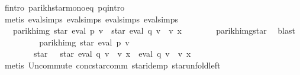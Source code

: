 \begin{isabellebody}
\ f{\isacharprime}{\kern0pt}{\isacharunderscore}{\kern0pt}intro\ parikh{\isacharunderscore}{\kern0pt}star{\isacharunderscore}{\kern0pt}mono{\isacharunderscore}{\kern0pt}eq\ p{\isacharunderscore}{\kern0pt}q{\isacharunderscore}{\kern0pt}intro\isanewline
\ \ \ \ \ \ \isamarkupfalse%
\ {\isacharparenleft}{\kern0pt}metis\ eval{\isachardot}{\kern0pt}simps{\isacharparenleft}{\kern0pt}{}{\isacharparenright}{\kern0pt}\ eval{\isachardot}{\kern0pt}simps{\isacharparenleft}{\kern0pt}{}{\isacharparenright}{\kern0pt}\ eval{\isachardot}{\kern0pt}simps{\isacharparenleft}{\kern0pt}{}{\isacharparenright}{\kern0pt}\ eval{\isachardot}{\kern0pt}simps{\isacharparenleft}{\kern0pt}{}{\isacharparenright}{\kern0pt}{\isacharparenright}{\kern0pt}\isanewline
\ \ \ \ \isamarkupfalse%
\ \isamarkupfalse%
\ {\isachardoublequoteopen}{\isasymdots}\ {\isacharequal}{\kern0pt}\ parikh{\isacharunderscore}{\kern0pt}img\ {\isacharparenleft}{\kern0pt}star\ {\isacharparenleft}{\kern0pt}eval\ p\ v{\isacharparenright}{\kern0pt}\ {\isacharat}{\kern0pt}{\isacharat}{\kern0pt}\ star\ {\isacharparenleft}{\kern0pt}eval\ q\ v\ {\isacharat}{\kern0pt}{\isacharat}{\kern0pt}\ v\ x{\isacharparenright}{\kern0pt}{\isacharparenright}{\kern0pt}{\isachardoublequoteclose}\isanewline
\ \ \ \ \ \ \isamarkupfalse%
\ parikh{\isacharunderscore}{\kern0pt}img{\isacharunderscore}{\kern0pt}star\ \isamarkupfalse%
\ blast\isanewline
\ \ \ \ \isamarkupfalse%
\ \isamarkupfalse%
\ {\isachardoublequoteopen}{\isasymdots}\ {\isacharequal}{\kern0pt}\ parikh{\isacharunderscore}{\kern0pt}img\ {\isacharparenleft}{\kern0pt}star\ {\isacharparenleft}{\kern0pt}eval\ p\ v{\isacharparenright}{\kern0pt}\ {\isacharat}{\kern0pt}{\isacharat}{\kern0pt}\isanewline
\ \ \ \ \ \ \ \ star\ {\isacharparenleft}{\kern0pt}{\isacharbraceleft}{\kern0pt}{\isacharbrackleft}{\kern0pt}{\isacharbrackright}{\kern0pt}{\isacharbraceright}{\kern0pt}\ {\isasymunion}\ star\ {\isacharparenleft}{\kern0pt}eval\ q\ v\ {\isacharat}{\kern0pt}{\isacharat}{\kern0pt}\ v\ x{\isacharparenright}{\kern0pt}\ {\isacharat}{\kern0pt}{\isacharat}{\kern0pt}\ eval\ q\ v\ {\isacharat}{\kern0pt}{\isacharat}{\kern0pt}\ v\ x{\isacharparenright}{\kern0pt}{\isacharparenright}{\kern0pt}{\isachardoublequoteclose}\isanewline
\ \ \ \ \ \ \isamarkupfalse%
\ {\isacharparenleft}{\kern0pt}metis\ Un{\isacharunderscore}{\kern0pt}commute\ conc{\isacharunderscore}{\kern0pt}star{\isacharunderscore}{\kern0pt}comm\ star{\isacharunderscore}{\kern0pt}idemp\ star{\isacharunderscore}{\kern0pt}unfold{\isacharunderscore}{\kern0pt}left{\isacharparenright}{\kern0pt}\isanewline

\end{isabellebody}
